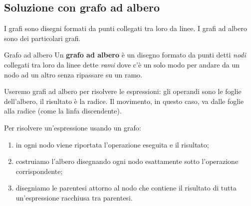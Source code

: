 \subsection{Soluzione con grafo ad albero}
I grafi sono disegni formati da punti collegati tra loro da linee. 
I grafi ad albero sono dei particolari grafi.

\begin{definizione}{Grafo ad albero}{}
Un \textbf{grafo ad albero} è un disegno formato da punti detti 
\emph{nodi} collegati tra loro da linee dette \emph{rami} dove c'è un 
solo modo per andare da un nodo ad un altro senza ripassare su un ramo.
\end{definizione}


Useremo grafi ad albero per risolvere le 
espressioni:
gli operandi sono le foglie dell'albero, il risultato è la radice. 
Il movimento, in questo caso, va dalle foglie alla radice (come la linfa 
discendente).

\begin{procedura}{}{}
 Per risolvere un'espressione usando un grafo:
\begin{enumerate} [noitemsep]
 \item in ogni nodo viene riportata l'operazione eseguita e il risultato;
 \item costruiamo l'albero disegnando ogni nodo esattamente sotto
  l'operazione corrispondente;
 \item disegniamo le parentesi attorno al nodo che contiene il
  risultato di tutta un'espressione racchiusa tra parentesi.
\end{enumerate}
\end{procedura}

